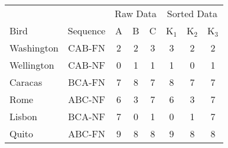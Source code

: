 \begin{tabular}{l|c|ccc||ccc}
\multicolumn{2}{c|}{} & \multicolumn{3}{c||}{\cellcolor{gray!20} Raw Data} & \multicolumn{3}{c}{\cellcolor{gray!20}Sorted Data}\\
Bird & Sequence & A & B & C & K$_1$  & K$_2$ & K$_3$ \\\midrule
Washington & CAB-FN & 2 & 2 & 3 & 3 & 2 & 2 \\
Wellington & CAB-NF & 0 & 1 & 1 & 1 & 0 & 1 \\
Caracas & BCA-FN & 7 & 8 & 7 & 8 & 7 & 7 \\
Rome & ABC-NF & 6 & 3 & 7 & 6 & 3 & 7 \\
Lisbon & BCA-NF & 7 & 0 & 1 & 0 & 1 & 7 \\
Quito & ABC-FN & 9 & 8 & 8 & 9 & 8 & 8 \\
\end{tabular}